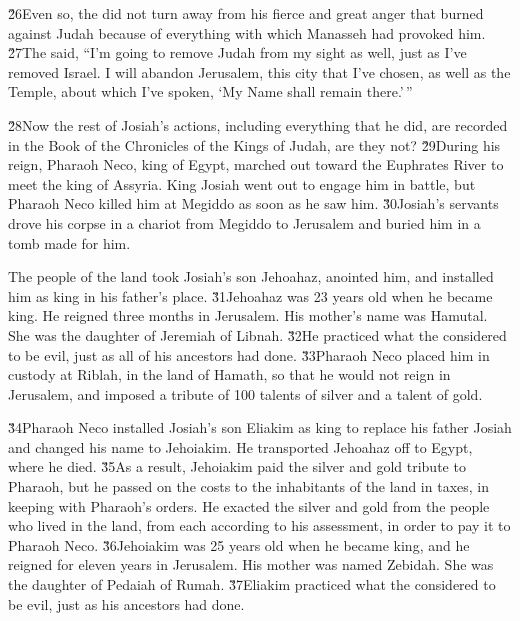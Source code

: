 \v{26}Even so, the  did not turn away from his fierce and great anger that burned against Judah because of everything with which Manasseh had provoked him. \v{27}The  said, ``I'm going to remove Judah from my sight as well, just as I've removed Israel. I will abandon Jerusalem, this city that I've chosen, as well as the Temple, about which I've spoken, `My Name shall remain there.'\,''

\v{28}Now the rest of Josiah's actions, including everything that he did, are recorded in the Book of the Chronicles of the Kings of Judah, are they not? \v{29}During his reign, Pharaoh Neco, king of Egypt, marched out toward the Euphrates River to meet the king of Assyria. King Josiah went out to engage him in battle, but Pharaoh Neco killed him at Megiddo as soon as he saw him. \v{30}Josiah's servants drove his corpse in a chariot from Megiddo to Jerusalem and buried him in a tomb made for him.

The people of the land took Josiah's son Jehoahaz, anointed him, and installed him as king in his father's place. \v{31}Jehoahaz was 23 years old when he became king. He reigned three months in Jerusalem. His mother's name was Hamutal. She was the daughter of Jeremiah of Libnah. \v{32}He practiced what the  considered to be evil, just as all of his ancestors had done. \v{33}Pharaoh Neco placed him in custody at Riblah, in the land of Hamath, so that he would not reign in Jerusalem, and imposed a tribute of 100 talents of silver and a talent of gold.

\v{34}Pharaoh Neco installed Josiah's son Eliakim as king to replace his father Josiah and changed his name to Jehoiakim. He transported Jehoahaz off to Egypt, where he died. \v{35}As a result, Jehoiakim paid the silver and gold tribute to Pharaoh, but he passed on the costs to the inhabitants of the land in taxes, in keeping with Pharaoh's orders. He exacted the silver and gold from the people who lived in the land, from each according to his assessment, in order to pay it to Pharaoh Neco. \v{36}Jehoiakim was 25 years old when he became king, and he reigned for eleven years in Jerusalem. His mother was named Zebidah. She was the daughter of Pedaiah of Rumah. \v{37}Eliakim practiced what the  considered to be evil, just as his ancestors had done.

